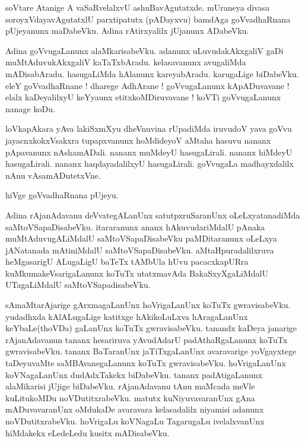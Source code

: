 \documentclass{article}
\begin{document}
\begin{mn}%
soVtare Atanige A vaSaRvelalxvU ashuBavAgutatxde. mUraneya divasa soroyxVdayavAgutatxlU 
parxtipatutx (pADayxvu) bamdAga goVvadhaRnana pUjeyanunx maDabeVku. Adina rAtirxyalilx jUjanunx 
ADabeVku.
\end{mn}

\begin{mn}%
Adina goVvugaLanunx alaMkarisabeVku. adanunx uLuvudakAkxgaliV gaDi muMtAduvukAkxgaliV 
kaTaTxbAradu. kelasavanunx avugaliMda mADisabAradu. hasugaLiMda hAlanunx kareyabAradu. karugaLige 
biDabeVku. eleY goVvadhaRnane ! dharege AdhArane ! goVvugaLanunx kApADuvavane ! elalx 
kaDeyalilxyU keYyaunx etitxkoMDiruvavane ! koVTi goVvugaLanunx nanage koDu.
\end{mn}

\begin{mn}%
loVkapAkara yAva lakiSxmXyu dheVnuvina rUpadiMda iruvudoV yava goVvu jayacnxkokxVsakxra 
tupapxvanunx hoMdideyoV aMtaha hasuvu nananx pApavanunx nAshamADali. nananx muMdeyU hasugaLirali. 
nananx hiMdeyU hasugaLirali. nananx haqdayadalilxyU hasugaLirali. goVvugaLa madhayxdalilx nAnu 
vAsamADutetxVne.
\end{mn}

\begin{center}
hiVge goVvadhaRnana pUjeyu.
\end{center}

\begin{mn}%
Adina rAjanAdavanu deVvategALanUnx satutpxruSaranUnx oLeLxyatanadiMda saMtoVSapaDisabeVku. 
itararanunx ananx hAkuvudariMdalU pAnaka muMtAduvugALiMdalU saMtoVSapaDisabeVku paMDitaranunx 
oLeLxya jANatanada mAtiniMdalU saMtoVSapaDisabeVku. aMtaHpuradalilxruva heMgasarigU ALugaLigU 
baTeTx tAMbUla hUvu pacacxkapURra kuMkumakeVsarigaLanunx koTuTx utatxmavAda BakaSxyXgaLiMdalU 
UTagaLiMdalU saMtoVSapadisabeVku.
\end{mn}

\begin{mn}%
sAmaMtarAjarige gArxmagaLanUnx hoVrigaLanUnx koTuTx gwravisabeVku. yudadhxda kAlALugaLige katitxge 
hAkikoLuLxva hAragaLanUnx keYbaLe(thoVDa) gaLanUnx koTuTx gwravisabeVku. tanandx kaDeya janarige 
rAjanAdavanun tananx hesariruva yAvudAdarU padAthaRgaLanunx koTuTx gwravisabeVku. tananx 
BaTaranUnx jaTiTxgaLanUnx avaravarige yoVgayxtege taDeyuvaMte saMBAvanegaLanunx koTuTx 
gwravisabeVku. hoVrigaLanUnx koVNagaLanUnx dudAdxTakekx biDabeVku. tananx padAtigaLanunx 
alaMikarisi jUjige biDabeVku. rAjanAdavanu tAnu maMcada meVle kuLitukoMDu noVDutitxrabeVku. 
matutx kuNiyuvavaranUnx gAna mADuvavaranUnx oMdukaDe avaravara kelasadalilx niyamisi adanunx 
noVDutitxrabeVku. hoVrigaLu koVNagaLu TagarugaLu ivelalxvanUnx hiMdakekx eLedeLedu kusitx 
mADisabeVku.
\end{mn}
\end{document}
